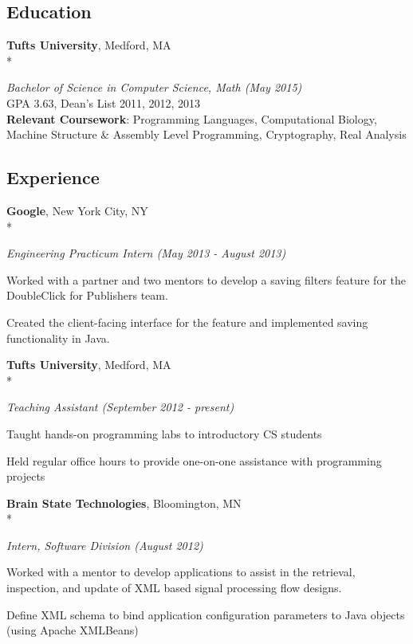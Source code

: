 \documentclass{article}
\newcommand{\position}[2]{
  \textit{#1 (#2)}
}
\newcommand{\affiliation}[2]{
  \textbf{#1}, #2 \\*
}
\newenvironment{achievements}{
  \begin{compactitem} }{
  \end{compactitem}
}
\newcommand{\skill}[2]{
  \textbf{#1}: #2
  \smallskip
}
\begin{document}
\subsection*{Education}
  \affiliation{Tufts University}                             {Medford, MA}
    \position{Bachelor of Science in Computer Science, Math} {May 2015} \\
  GPA 3.63, Dean's List 2011, 2012, 2013 \\
  \skill{Relevant Coursework}
        {Programming Languages, Computational Biology, Machine Structure \&
        Assembly Level Programming, Cryptography, Real Analysis}

\subsection*{Experience}
  \affiliation{Google}                       {New York City, NY}
    \position {Engineering Practicum Intern} {May 2013 - August 2013}
    \begin{achievements}
      \item Worked with a partner and two mentors to develop a
            saving filters feature for the \\ DoubleClick for Publishers team.
      \item Created the client-facing interface for the feature and
      implemented saving functionality in Java.
    \end{achievements}
    \smallskip

  \affiliation{Tufts University}   {Medford, MA}
    \position {Teaching Assistant} {September 2012 - present}
    \begin{achievements}
      \item Taught hands-on programming labs to introductory CS students
      \item Held regular office hours to provide one-on-one assistance with
            programming projects
    \end{achievements}
    \smallskip

  \affiliation{Brain State Technologies}  {Bloomington, MN}
    \position {Intern, Software Division} {August 2012}
    \begin{achievements}
      \item Worked with a mentor to develop applications to assist in the
            retrieval, inspection, and update of XML based signal processing 
            flow designs.
      \item Define XML schema to bind application configuration parameters to 
            Java objects (using Apache XMLBeans)
    \end{achievements}
\end{document}
